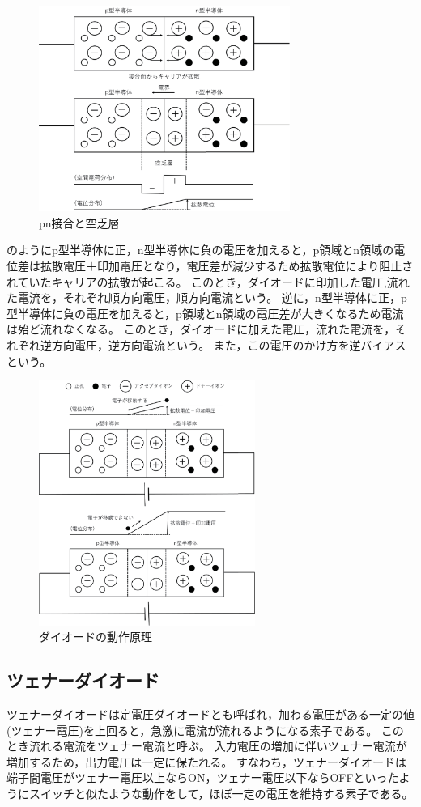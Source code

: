 \documentclass[11pt,dvipdfmx]{jarticle}
\begin{document}
\begin{figure}[!h]
 \centering
 \includegraphics[width=8.2cm]{fig1.eps}
 \caption{pn接合と空乏層}
 \label{fig:fig1}
\end{figure}%

のようにp型半導体に正，n型半導体に負の電圧を加えると，p領域とn領域の電位差は拡散電圧＋印加電圧となり，電圧差が減少するため拡散電位により阻止されていたキャリアの拡散が起こる。
このとき，ダイオードに印加した電圧,流れた電流を，それぞれ順方向電圧，順方向電流という。
逆に，n型半導体に正，p型半導体に負の電圧を加えると，p領域とn領域の電圧差が大きくなるため電流は殆ど流れなくなる。
このとき，ダイオードに加えた電圧，流れた電流を，それぞれ逆方向電圧，逆方向電流という。
また，この電圧のかけ方を逆バイアスという。

\begin{figure}[!t]
 \centering
 \includegraphics[height=8.0cm]{fig2.eps}
 \caption{ダイオードの動作原理}
 \label{fig:fig2}
\end{figure}%

\subsection{ツェナーダイオード}
ツェナーダイオードは定電圧ダイオードとも呼ばれ，加わる電圧がある一定の値(ツェナー電圧)を上回ると，急激に電流が流れるようになる素子である。
このとき流れる電流をツェナー電流と呼ぶ。
入力電圧の増加に伴いツェナー電流が増加するため，出力電圧は一定に保たれる。
すなわち，ツェナーダイオードは端子間電圧がツェナー電圧以上ならON，ツェナー電圧以下ならOFFといったようにスイッチと似たような動作をして，ほぼ一定の電圧を維持する素子である。
\end{document}
